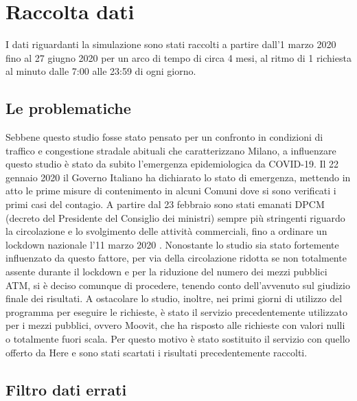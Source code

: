\section{Raccolta dati}

I dati riguardanti la simulazione sono stati raccolti a partire dall'1 marzo 2020 fino al 27 giugno 2020 per un arco di tempo di circa 4 mesi, al ritmo di 1 richiesta al minuto dalle 7:00 alle 23:59 di ogni giorno.

\subsection{Le problematiche}

Sebbene questo studio fosse stato pensato per un confronto in condizioni di traffico e congestione stradale abituali che caratterizzano Milano, a influenzare questo studio è stato da subito l'emergenza epidemiologica da COVID-19. Il 22 gennaio 2020 il Governo Italiano ha dichiarato lo stato di emergenza, mettendo in atto le prime misure di contenimento in alcuni Comuni dove si sono verificati i primi casi del contagio. A partire dal 23 febbraio sono stati emanati DPCM (decreto del Presidente del Consiglio dei ministri) sempre più stringenti riguardo la circolazione e lo svolgimento delle attività commerciali, fino a ordinare un lockdown nazionale l'11 marzo 2020 \cite{misuredelgovernopercovid}. Nonostante lo studio sia stato fortemente influenzato da questo fattore, per via della circolazione ridotta se non totalmente assente durante il lockdown e per la riduzione del numero dei mezzi pubblici ATM, si è deciso comunque di procedere, tenendo conto dell'avvenuto sul giudizio finale dei risultati. A ostacolare lo studio, inoltre, nei primi giorni di utilizzo del programma per eseguire le richieste, è stato il servizio precedentemente utilizzato per i mezzi pubblici, ovvero Moovit, che ha risposto alle richieste con valori nulli o totalmente fuori scala. Per questo motivo è stato sostituito il servizio con quello offerto da Here e sono stati scartati i risultati precedentemente raccolti.

\subsection{Filtro dati errati}

